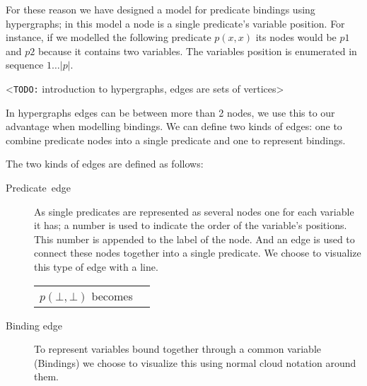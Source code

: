 \documentclass[../Master.tex]{subfiles}
\begin{document}
	For these reason we have designed a model for predicate bindings using hypergraphs;
	in this	model a node is a single predicate's variable position.
	For instance, if we modelled the following predicate $p(x,x)$ its nodes would be $p1$ and $p2$ because it contains two variables.
	The variables position is enumerated in sequence $1\ldots |p|$.

	<\texttt{TODO:} introduction to hypergraphs, edges are sets of vertices>

	In hypergraphs edges can be between more than 2 nodes, we use this to our advantage when modelling bindings.
	We can define two kinds of edges: one to combine predicate nodes into a single predicate and one to represent bindings.

	The two kinds of edges are defined as follows:


	\begin{description}
		\item [{Predicate~edge}] As  single predicates are represented as several nodes one for each variable
		it has; a number is used to indicate the order of the variable's
		positions. This number is appended to the label of the node. And an edge is used to connect these nodes together into a single predicate.
		We choose to visualize this type of edge with a line.\\
		\begin{tabular}{c  c}

			$p(\bot,\bot)$ becomes &
            \raisebox{-.5\height}{\resizebox{0.16\linewidth}{!}{}}
				\tabularnewline%
		\end{tabular}
		\item[{Binding edge}] To represent variables bound together through a common variable (Bindings) we
		choose to visualize this using normal cloud notation around them.\\
		\begin{tabular}{c  c}


\end{tabular}
\end{description}
\end{document}

